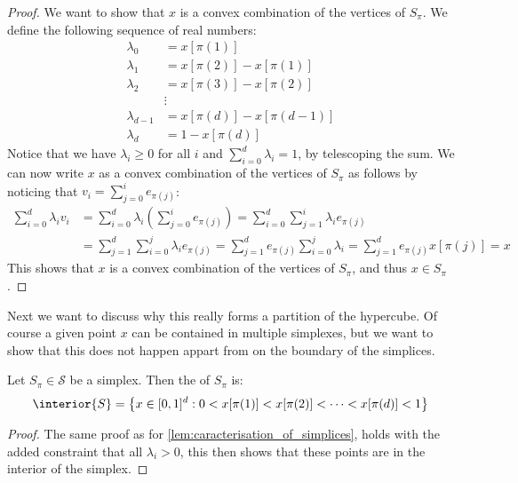\begin{proof}
    We want to show that $x$ is a convex combination of the vertices of $S_{\pi}$. We define the following sequence of real numbers:
    \begin{align*}
        \lambda_0     & = x[\pi(1)]               \\
        \lambda_1     & = x[\pi(2)] - x[\pi(1)]   \\
        \lambda_2     & = x[\pi(3)] - x[\pi(2)]   \\
                      & \vdots                    \\
        \lambda_{d-1} & = x[\pi(d)] - x[\pi(d-1)] \\
        \lambda_d     & = 1 - x[\pi(d)]
    \end{align*}
    Notice that we have $\lambda_i \geq 0$ for all $i$ and $\sum_{i=0}^{d} \lambda_i = 1$, by telescoping the sum. We can now write $x$ as a convex combination of the vertices of $S_{\pi}$ as follows by noticing that $v_i = \sum_{j=0}^{i} e_{\pi(j)}$:
    \begin{align*}
        \sum_{i=0}^{d} \lambda_i v_i & = \sum_{i=0}^{d} \lambda_i \left( \sum_{j=0}^{i} e_{\pi(j)} \right)  = \sum_{i=0}^{d} \sum_{j=1}^{i} \lambda_i e_{\pi(j)}                                \\
                                     & = \sum_{j=1}^{d} \sum_{i=0}^{j} \lambda_i e_{\pi(j)}  = \sum_{j=1}^{d} e_{\pi(j)} \sum_{i=0}^{j} \lambda_i		 = \sum_{j=1}^{d} e_{\pi(j)} x[\pi(j)]		     = x
    \end{align*}
    This shows that $x$ is a convex combination of the vertices of $S_{\pi}$, and thus $x \in S_{\pi}$.
\end{proof}
Next we want to discuss why this really forms a partition of the hypercube. Of course a given point $x$ can be contained in multiple simplexes, but we want to show that this does not happen appart from on the boundary of the simplices.
\begin{lemma}
    Let $S_{\pi} \in \mathcal{S}$ be a simplex. Then the  of $S_{\pi}$ is:
    \begin{align*}
        \interior{S} = \set{x \in [0, 1]^d : 0 < x[\pi(1)] < x[\pi(2)] < \dots < x[\pi(d)] < 1}
    \end{align*}
\end{lemma}
\begin{proof}
    The same proof as for \cref{lem:caracterisation_of_simplices}, holds with the added constraint that all $\lambda_i > 0$, this then shows that these points are in the interior of the simplex.
\end{proof}
